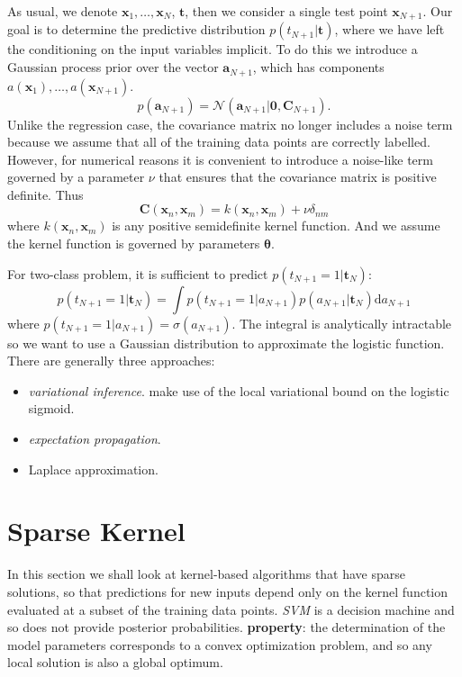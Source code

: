 \documentclass[a4paper]{book}
\newcommand{\normD}{\mathcal{N}}
\newcommand{\mbf}{\mathbf}
\newcommand{\ud}{\mathrm{d}}
\newcommand{\CC}{\mbf C}
\newcommand{\ttt}{\mbf t}
\newcommand{\xx}{\mbf x}
\newcommand{\bmz}{\bm{0}}
\begin{document}
As usual, we denote $\xx_1,\dots,\xx_N$, $\ttt$, then we consider a single test point $\xx_{N+1}$. Our goal is to determine the predictive distribution $p(t_{N+1}|\ttt)$, where we have left the conditioning on the input variables implicit. To do this we introduce a Gaussian process
prior over the vector $\mbf a_{N+1}$, which has components $a(\xx_1), \dots, a(\xx_{N+1})$.
\begin{equation}
    p(\mbf a_{N+1}) = \normD(\mbf a_{N+1}|\bmz,\CC_{N+1}).
\end{equation}
Unlike the regression case, the covariance matrix no longer includes a noise term because we assume that all of the training data points are correctly labelled. However, for numerical reasons it is convenient to introduce a noise-like term governed by a parameter $\nu$ that ensures that the covariance matrix is positive definite. Thus
\begin{equation}
    \CC(\xx_n,\xx_m) = k(\xx_n,\xx_m)+\nu\delta_{nm}
\end{equation}
where $k(\xx_n,\xx_m)$ is any positive semidefinite kernel function. And we assume the kernel function is governed by parameters $\bm{\theta}$.

For two-class problem, it is sufficient to predict $p(t_{N+1}=1|\ttt_N)$:
\begin{equation}
    p(t_{N+1}=1|\ttt_N) = \int p(t_{N+1}=1|a_{N+1})p(a_{N+1}|\ttt_N)\ud a_{N+1}
\end{equation}
where $p(t_{N+1}=1|a_{N+1})=\sigma(a_{N+1})$. The integral is analytically intractable so we want to use a Gaussian distribution to approximate the logistic function. There are generally three approaches:
\begin{itemize}
    \item \emph{variational inference}. make use of the local variational bound on the logistic sigmoid.
    \item \emph{expectation propagation}.
    \item Laplace approximation.
\end{itemize}



\section{Sparse Kernel}
In this section we shall look at kernel-based algorithms that have sparse solutions, so that predictions for new inputs depend only on the kernel function evaluated at a subset of the training data points.\newline
\textit{SVM} is a decision machine and so does not provide posterior probabilities.
\textbf{property}: the  determination of the model parameters corresponds to a convex optimization problem, and so any local solution is also a global optimum.
\end{document}
